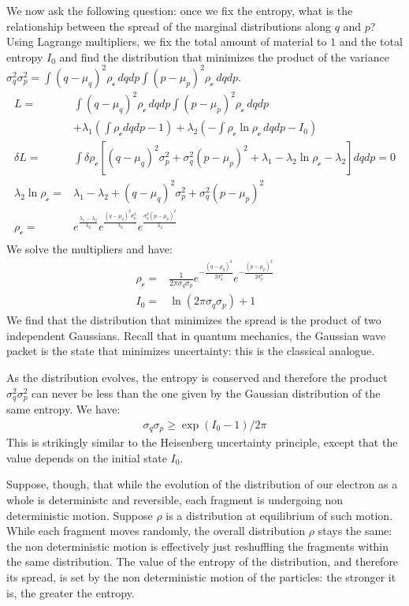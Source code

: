 \documentclass[smallextended]{svjour3}
\numberwithin{equation}{section}
\theoremstyle{definition}
\begin{document}
We now ask the following question: once we fix the entropy, what is the relationship between the spread of the marginal distributions along $q$ and $p$? Using Lagrange multipliers, we fix the total amount of material to $1$ and the total entropy $I_0$ and find the distribution that minimizes the product of the variance $\sigma_q^2 \sigma_p^2 = \int (q-\mu_q)^2 \rho_{\mathcal{c}} \, dqdp \int (p-\mu_p)^2 \rho_{\mathcal{c}} \, dqdp$.
\begin{align*}
L = &\int (q-\mu_q)^2 \rho_{\mathcal{c}} \, dqdp \int (p-\mu_p)^2 \rho_{\mathcal{c}} \, dqdp \\
&+ \lambda_1(\int \rho_{\mathcal{c}} dqdp - 1) + \lambda_2(- \int \rho_{\mathcal{c}} \ln \rho_{\mathcal{c}} \, dqdp - I_0)\\
\delta L = &\int \delta \rho_{\mathcal{c}} [(q-\mu_q)^2 \sigma_p^2 + \sigma_q^2 (p-\mu_p)^2 + \lambda_1 - \lambda_2 \ln \rho_{\mathcal{c}} - \lambda_2 ] dqdp = 0 \\
\lambda_2 \ln \rho_{\mathcal{c}} = &\lambda_1 - \lambda_2 + (q-\mu_q)^2 \sigma_p^2 + \sigma_q^2 (p-\mu_p)^2 \\
\rho_{\mathcal{c}} = &e^{\frac{\lambda_1 - \lambda_2}{\lambda_2}}e^{\frac{(q-\mu_q)^2 \sigma_p^2}{\lambda_2}}e^{\frac{\sigma_q^2 (p-\mu_p)^2}{\lambda_2}}\\
\end{align*}
We solve the multipliers and have:
\begin{align*}
\rho_{\mathcal{c}} = &\frac{1}{ 2 \pi \sigma_q \sigma_p} e^{-\frac{(q-\mu_q)^2}{2\sigma_q^2}} e^{-\frac{(p-\mu_p)^2}{2\sigma_p^2}} \\
I_0 = &\ln (2\pi\sigma_q\sigma_p) + 1
\end{align*}
We find that the distribution that minimizes the spread is the product of two independent Gaussians. Recall that in quantum mechanics, the Gaussian wave packet is the state that minimizes uncertainty: this is the classical analogue.

As the distribution evolves, the entropy is conserved and therefore the product $\sigma_q^2 \sigma_p^2$ can never be less than the one given by the Gaussian distribution of the same entropy. We have:
\begin{align*}
\sigma_q\sigma_p \geq \exp (I_0 - 1) / 2 \pi 
\end{align*}
This is strikingly similar to the Heisenberg uncertainty principle, except that the value depends on the initial state $I_0$.

Suppose, though, that while the evolution of the distribution of our electron as a whole is deterministc and reversible, each fragment is undergoing non deterministic motion. Suppose $\rho$ is a distribution at equilibrium of such motion. While each fragment moves randomly, the overall distribution $\rho$ stays the same: the non deterministic motion is effectively just reshuffling the fragments within the same distribution. The value of the entropy of the distribution, and therefore its spread, is set by the non deterministic motion of the particles: the stronger it is, the greater the entropy.
\end{document}
